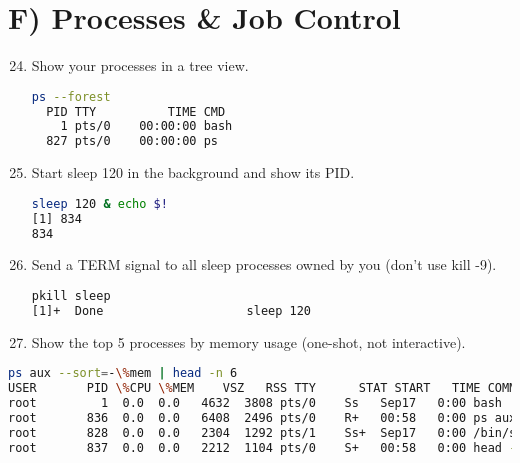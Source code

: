 \section*{F) Processes \& Job Control}
\begin{enumerate}
\setcounter{enumi}{23}
\item Show your processes in a tree view. \vspace{2em}\\
\begin{lstlisting}[language=sh]
ps --forest
  PID TTY          TIME CMD
    1 pts/0    00:00:00 bash
  827 pts/0    00:00:00 ps
\end{lstlisting}
\item Start sleep 120 in the background and show its PID. \vspace{2em}\\
\begin{lstlisting}[language=sh]
sleep 120 & echo $!
[1] 834
834
\end{lstlisting}
\item Send a TERM signal to all sleep processes owned by you (don’t use kill -9). \vspace{2em}\\
\begin{lstlisting}[language=sh]
pkill sleep
[1]+  Done                    sleep 120
\end{lstlisting}
\item Show the top 5 processes by memory usage (one-shot, not interactive). \vspace{2em}\\
\end{enumerate}
\begin{lstlisting}[language=sh]
ps aux --sort=-\%mem | head -n 6
USER       PID \%CPU \%MEM    VSZ   RSS TTY      STAT START   TIME COMMAND
root         1  0.0  0.0   4632  3808 pts/0    Ss   Sep17   0:00 bash
root       836  0.0  0.0   6408  2496 pts/0    R+   00:58   0:00 ps aux --sort=-\%mem
root       828  0.0  0.0   2304  1292 pts/1    Ss+  Sep17   0:00 /bin/sh
root       837  0.0  0.0   2212  1104 pts/0    S+   00:58   0:00 head -n 6
\end{lstlisting}
